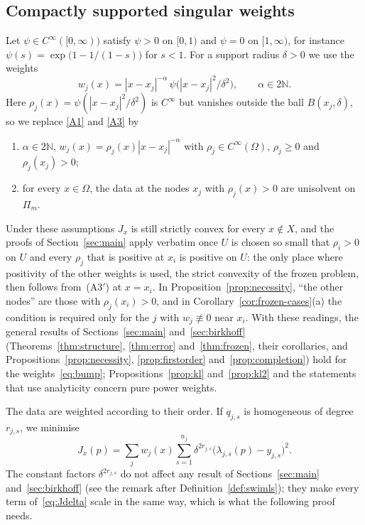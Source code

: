 \documentclass[12pt]{amsart}
\theoremstyle{definition}
\theoremstyle{remark}
\newcommand{\N}{\mathbb{N}}
\newcommand{\Pm}{\Pi_m}
\begin{document}
\subsection{Compactly supported singular weights}
Let $\psi\in C^\infty([0,\infty))$ satisfy $\psi>0$ on $[0,1)$ and $\psi=0$ on $[1,\infty)$, for
instance $\psi(s)=\exp\bigl(1-1/(1-s)\bigr)$ for $s<1$. For a support radius $\delta>0$ we use
the weights
\begin{equation}\label{eq:bump}
  w_j(x)=|x-x_j|^{-\alpha}\,\psi\bigl(|x-x_j|^2/\delta^2\bigr),\qquad \alpha\in2\N .
\end{equation}
Here $\rho_j(x)=\psi(|x-x_j|^2/\delta^2)$ is $C^\infty$ but vanishes outside the ball
$B(x_j,\delta)$, so we replace \ref{A1} and \ref{A3} by
\begin{enumerate}[label=(A\arabic*$'$)]
  \item[(A1$'$)] $\alpha\in2\N$, $w_j(x)=\rho_j(x)|x-x_j|^{-\alpha}$ with $\rho_j\in C^\infty(\Omega)$,
        $\rho_j\ge0$ and $\rho_j(x_j)>0$;
  \item[(A3$'$)] for every $x\in\Omega$, the data at the nodes $x_j$ with $\rho_j(x)>0$ are
        unisolvent on $\Pm$.
\end{enumerate}
Under these assumptions $J_x$ is still strictly convex for every $x\notin X$, and the proofs of
Section~\ref{sec:main} apply verbatim once $U$ is chosen so small that $\rho_i>0$ on $U$ and
every $\rho_j$ that is positive at $x_i$ is positive on $U$: the only place where positivity
of the other weights is used, the strict convexity of the frozen problem, then follows
from~(A3$'$) at $x=x_i$. In Proposition~\ref{prop:necessity}, ``the other nodes'' are those
with $\rho_j(x_i)>0$, and in Corollary~\ref{cor:frozen-cases}(a) the condition is required only
for the $j$ with $w_j\not\equiv0$ near $x_i$. With these readings, the general results of
Sections~\ref{sec:main} and~\ref{sec:birkhoff} (Theorems~\ref{thm:structure}, \ref{thm:error}
and~\ref{thm:frozen}, their corollaries, and Propositions~\ref{prop:necessity},
\ref{prop:firstorder} and~\ref{prop:completion}) hold for the weights~\eqref{eq:bump};
Propositions~\ref{prop:kl} and~\ref{prop:kl2} and the statements that use analyticity concern
pure power weights.

The data are weighted according to their order. If $q_{j,s}$ is homogeneous of degree
$r_{j,s}$, we minimise
\begin{equation}\label{eq:Jdelta}
  J_x(p)=\sum_{j}w_j(x)\sum_{s=1}^{n_j}\delta^{2r_{j,s}}\bigl(\lambda_{j,s}(p)-y_{j,s}\bigr)^2 .
\end{equation}
The constant factors $\delta^{2r_{j,s}}$ do not affect any result of
Sections~\ref{sec:main} and~\ref{sec:birkhoff} (see the remark after
Definition~\ref{def:swimls}); they make every term of~\eqref{eq:Jdelta} scale in the same way,
which is what the following proof needs.
\end{document}
